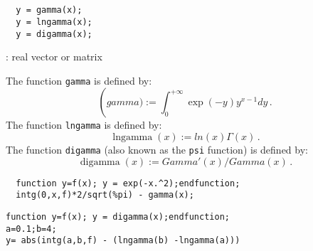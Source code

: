 \begin{mandesc}
  \\
  \\
\end{mandesc}
\begin{calling_sequence}
\begin{verbatim}
  y = gamma(x);
  y = lngamma(x);  
  y = digamma(x);  
\end{verbatim}
\end{calling_sequence}
\begin{parameters}
  \begin{varlist}
    : real vector or matrix
  \end{varlist}
\end{parameters}

\begin{mandescription}
  The function \verb+gamma+ is defined by: 
  \[
  \operatorname(gamma) := \int_0^{+\infty} \exp(-y)y^{x-1} dy \,.
  \]
  The function \verb+lngamma+ is defined by:
  \[
  \operatorname{lngamma}(x) := ln(x)\Gamma(x) \,.
  \]
  The function \verb+digamma+ (also known as the \verb+psi+ function) 
  is defined by:
  \[
  \operatorname{digamma}(x) := Gamma'(x)/Gamma(x)\,.
  \]  
\end{mandescription}
\begin{examples}
\begin{Verbatim}
  function y=f(x); y = exp(-x.^2);endfunction;
  intg(0,x,f)*2/sqrt(%pi) - gamma(x);
\end{Verbatim}

\begin{Verbatim}
function y=f(x); y = digamma(x);endfunction;
a=0.1;b=4;
y= abs(intg(a,b,f) - (lngamma(b) -lngamma(a)))
\end{Verbatim}

\end{examples}

